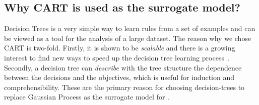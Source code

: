   
\subsection{Why CART is used as the surrogate model?}
Decision Trees is a very simple way to learn rules from a set of examples and can be viewed as a tool for the analysis of a large dataset. The reason why we chose CART is two-fold. Firstly, it is shown to be \textit{scalable} and there is a growing interest to find new ways to speed up the decision tree learning process~\cite{su2006fast}. 
Secondly, a decision tree can \textit{describe} with the tree structure the dependence between the decisions and the objectives, which is useful for induction and comprehensibility.
These are the primary reason for choosing decision-trees to replace Gaussian Process as the surrogate model for \flash.




